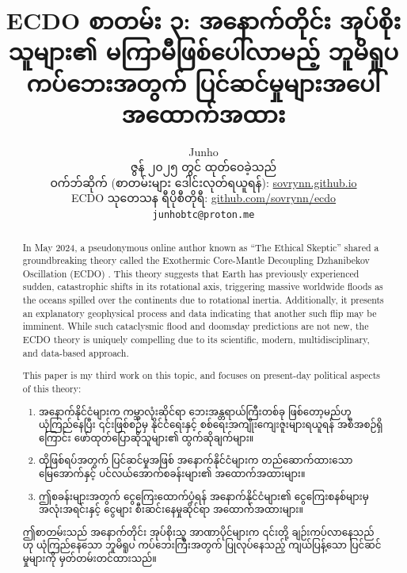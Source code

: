 \documentclass[10pt,twocolumn,letterpaper]{article}
\begin{document}
\title{ECDO စာတမ်း ၃: အနောက်တိုင်း အုပ်စိုးသူများ၏ မကြာမီဖြစ်ပေါ်လာမည့် ဘူမိရူပ ကပ်ဘေးအတွက် ပြင်ဆင်မှုများအပေါ် အထောက်အထား}

\author{Junho\\
ဇွန် ၂၀၂၅ တွင် ထုတ်ဝေခဲ့သည်\\
ဝက်ဘ်ဆိုက် (စာတမ်းများ ဒေါင်းလုတ်ရယူရန်): \href{https://sovrynn.github.io}{sovrynn.github.io}\\
ECDO သုတေသန ရီပိုစီတိုရီ: \href{https://github.com/sovrynn/ecdo}{github.com/sovrynn/ecdo}\\
{\tt\small junhobtc@proton.me}
}
\maketitle

\begin{abstract}
In May 2024, a pseudonymous online author known as “The Ethical Skeptic” \cite{0} shared a groundbreaking theory called the Exothermic Core-Mantle Decoupling Dzhanibekov Oscillation (ECDO) \cite{1}. This theory suggests that Earth has previously experienced sudden, catastrophic shifts in its rotational axis, triggering massive worldwide floods as the oceans spilled over the continents due to rotational inertia. Additionally, it presents an explanatory geophysical process and data indicating that another such flip may be imminent. While such cataclysmic flood and doomsday predictions are not new, the ECDO theory is uniquely compelling due to its scientific, modern, multidisciplinary, and data-based approach.

This paper is my third work \cite{2,3} on this topic, and focuses on present-day political aspects of this theory:
\begin{flushleft}
\begin{enumerate}
    \item အနောက်နိုင်ငံများက ကမ္ဘာလုံးဆိုင်ရာ ဘေးအန္တရာယ်ကြီးတစ်ခု ဖြစ်တော့မည်ဟု ယုံကြည်နေပြီး ၎င်းဖြစ်စဉ်မှ နိုင်ငံရေးနှင့် စစ်ရေးအကျိုးကျေးဇူးများရယူရန် အစီအစဉ်ရှိကြောင်း ဖော်ထုတ်ပြောဆိုသူများ၏ ထွက်ဆိုချက်များ။
    \item ထိုဖြစ်ရပ်အတွက် ပြင်ဆင်မှုအဖြစ် အနောက်နိုင်ငံများက တည်ဆောက်ထားသော မြေအောက်နှင့် ပင်လယ်အောက်စခန်းများ၏ အထောက်အထားများ။
    \item ဤစခန်းများအတွက် ငွေကြေးထောက်ပံ့ရန် အနောက်နိုင်ငံများ၏ ငွေကြေးစနစ်များမှ အလုံးအရင်းနှင့် ငွေများ စီးဆင်းနေမှုဆိုင်ရာ အထောက်အထားများ။
\end{enumerate}
\end{flushleft}

ဤစာတမ်းသည် အနောက်တိုင်း အုပ်စိုးသူ အာဏာပိုင်များက ၎င်းတို့ ချဉ်းကပ်လာနေသည်ဟု ယုံကြည်နေသော ဘူမိရူပ ကပ်ဘေးကြီးအတွက် ပြုလုပ်နေသည့် ကျယ်ပြန့်သော ပြင်ဆင်မှုများကို မှတ်တမ်းတင်ထားသည်။
\end{abstract}
\end{document}
